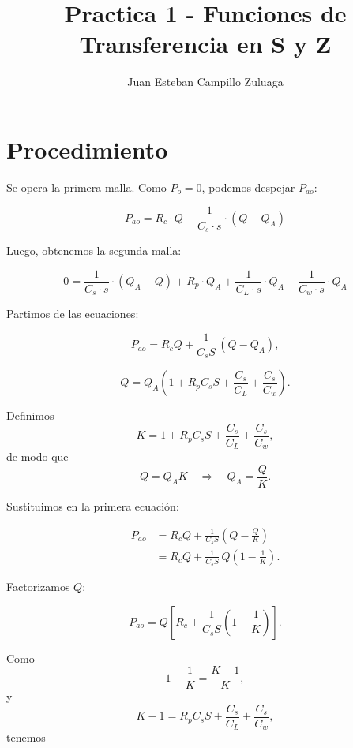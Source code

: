 \documentclass{article}
\title{Practica 1 - Funciones de Transferencia en S y Z }
\author{Juan Esteban Campillo Zuluaga}
\begin{document}
\maketitle



\section{Procedimiento}

Se opera la primera malla. Como $P_o = 0$, podemos despejar $P_{ao}$:

\begin{equation}
    P_{ao} = R_c \cdot Q + \frac{1}{C_s \cdot s} \cdot (Q - Q_A)
\end{equation}

Luego, obtenemos la segunda malla:

\begin{equation}
    0 = \frac{1}{C_s \cdot s} \cdot (Q_A - Q) + R_p \cdot Q_A + \frac{1}{C_L \cdot s} \cdot Q_A + \frac{1}{C_w \cdot s} \cdot Q_A
\end{equation}

Partimos de las ecuaciones:

\begin{equation}
P_{ao} = R_c Q + \frac{1}{C_s S}\,(Q - Q_A),
\end{equation}

\begin{equation}
Q = Q_A \left( 1 + R_p C_s S + \frac{C_s}{C_L} + \frac{C_s}{C_w} \right).
\end{equation}

Definimos
\[
K = 1 + R_p C_s S + \frac{C_s}{C_L} + \frac{C_s}{C_w},
\]
de modo que
\[
Q = Q_A K \quad \Rightarrow \quad Q_A = \frac{Q}{K}.
\]

Sustituimos en la primera ecuación:

\begin{align}
P_{ao} &= R_c Q + \frac{1}{C_s S}\left(Q - \frac{Q}{K}\right) \\
&= R_c Q + \frac{1}{C_s S}\,Q\left(1 - \frac{1}{K}\right).
\end{align}

Factorizamos $Q$:

\begin{equation}
P_{ao} = Q \left[ R_c + \frac{1}{C_s S}\left(1 - \frac{1}{K}\right) \right].
\end{equation}

Como
\[
1 - \frac{1}{K} = \frac{K-1}{K},
\]
y
\[
K - 1 = R_p C_s S + \frac{C_s}{C_L} + \frac{C_s}{C_w},
\]
tenemos
\end{document}
